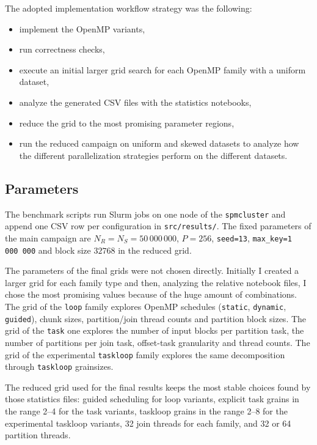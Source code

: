 \documentclass[11pt,a4paper]{article}
\begin{document}
The adopted implementation workflow strategy was the following:
\begin{itemize}
    \item implement the OpenMP variants,
    \item run correctness checks,
    \item execute an initial larger grid search for each OpenMP family with a uniform dataset,
    \item analyze the generated CSV files with the statistics notebooks,
    \item reduce the grid to the most promising parameter regions,
    \item run the reduced campaign on uniform and skewed datasets to analyze how the different parallelization strategies perform on the different datasets.
\end{itemize}

\subsection{Parameters}
The benchmark scripts run Slurm jobs on one node of the \texttt{spmcluster} and append one CSV row per configuration in \texttt{src/results/}. The fixed parameters of the main campaign are \(N_R=N_S=50\,000\,000\), \(P=256\), \texttt{seed=13}, \texttt{max\_key=1\,000\,000} and block size \(32768\) in the reduced grid.

The parameters of the final grids were not chosen directly. Initially I created a larger grid for each family type and then, analyzing the relative notebook files, I chose the most promising values because of the huge amount of combinations. The grid of the \texttt{loop} family explores OpenMP schedules (\texttt{static}, \texttt{dynamic}, \texttt{guided}), chunk sizes, partition/join thread counts and partition block sizes. The grid of the \texttt{task} one explores the number of input blocks per partition task, the number of partitions per join task, offset-task granularity and thread counts. The grid of the experimental \texttt{taskloop} family explores the same decomposition through \texttt{taskloop} grainsizes.

The reduced grid used for the final results keeps the most stable choices found by those statistics files: guided scheduling for loop variants, explicit task grains in the range 2--4 for the task variants, taskloop grains in the range 2--8 for the experimental taskloop variants, 32 join threads for each family, and 32 or 64 partition threads.
\end{document}
